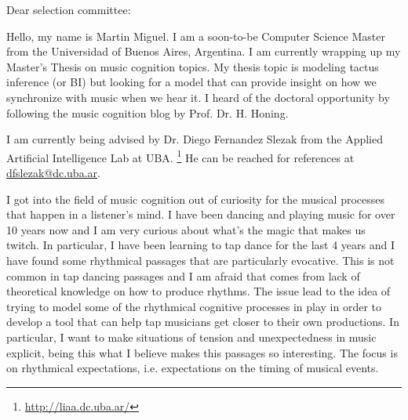 \documentclass[a4paper]{letter}
\begin{document}
\begin{letter}{}

\opening{Dear selection committee:}

Hello, my name is Martin Miguel. I am a soon-to-be Computer Science Master from
the Universidad of Buenos Aires, Argentina. I am currently wrapping up my
Master's Thesis on music cognition topics. My thesis topic is modeling tactus
inference (or BI) but looking for a model that can provide insight on how we
synchronize with music when we hear it. I heard of the doctoral opportunity by
following the music cognition blog by Prof. Dr. H. Honing.

I am currently being advised by Dr. Diego Fernandez Slezak from the Applied
Artificial Intelligence Lab at UBA.%
\footnote{\url{http://liaa.dc.uba.ar/}}
He can be reached for references at
\href{mailto:dfslezak@dc.uba.ar}{\url{dfslezak@dc.uba.ar}}.

I got into the field of music cognition out of curiosity for the musical
processes that happen in a listener's mind. I have been dancing and playing
music for over 10 years now and I am very curious about what's the magic that
makes us twitch. In particular, I have been learning to tap dance for the last
4 years and I have found some rhythmical passages that are particularly
evocative. This is not common in tap dancing passages and I am afraid that
comes from lack of theoretical knowledge on how to produce rhythms. The issue
lead to the idea of trying to model some of the rhythmical cognitive processes
in play in order to develop a tool that can help tap musicians get closer to
their own productions. In particular, I want to make situations of tension and
unexpectedness in music explicit, being this what I believe makes this passages
so interesting. The focus is on rhythmical expectations, i.e. expectations on
the timing of musical events.



\end{letter}
\end{document}

